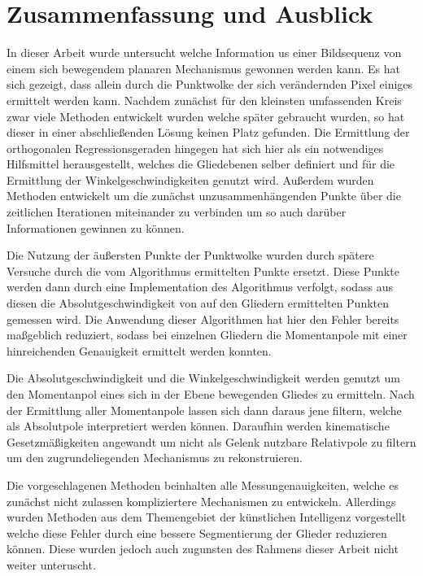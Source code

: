 
\chapter{Zusammenfassung und Ausblick} \label{ch:zusammenfassung_ausblick}


In dieser Arbeit wurde untersucht welche Information us einer Bildsequenz von einem sich bewegendem planaren Mechanismus gewonnen werden kann.
Es hat sich gezeigt, dass allein durch die Punktwolke der sich verändernden Pixel einiges ermittelt werden kann.
Nachdem zunächst für den kleinsten umfassenden Kreis zwar viele Methoden entwickelt wurden welche später gebraucht wurden, so hat dieser in einer abschlie{\ss}enden Lösung keinen Platz gefunden.
Die Ermittlung der orthogonalen Regressionsgeraden hingegen hat sich hier als ein notwendiges Hilfsmittel herausgestellt, welches die Gliedebenen selber definiert und für die Ermittlung der Winkelgeschwindigkeiten genutzt wird.
Au{\ss}erdem wurden Methoden entwickelt um die zunächst unzusammenhängenden Punkte über die zeitlichen Iterationen miteinander zu verbinden um so auch darüber Informationen gewinnen zu können.

Die Nutzung der äu{\ss}ersten Punkte der Punktwolke wurden durch spätere Versuche durch die vom  Algorithmus ermittelten Punkte ersetzt.
Diese Punkte werden dann durch eine Implementation des  Algorithmus verfolgt, sodass aus diesen die Absolutgeschwindigkeit von auf den Gliedern ermittelten Punkten gemessen wird.
Die Anwendung dieser Algorithmen hat hier den Fehler bereits ma{\ss}geblich reduziert, sodass bei einzelnen Gliedern die Momentanpole mit einer hinreichenden Genauigkeit ermittelt werden konnten.

Die Absolutgeschwindigkeit und die Winkelgeschwindigkeit werden genutzt um den Momentanpol eines sich in der Ebene bewegenden Gliedes zu ermitteln.
Nach der Ermittlung aller Momentanpole lassen sich dann daraus jene filtern, welche als Absolutpole interpretiert werden können.
Daraufhin werden kinematische Gesetzmä{\ss}igkeiten angewandt um nicht als Gelenk nutzbare Relativpole zu filtern um den zugrundeliegenden Mechanismus zu rekonstruieren.

Die vorgeschlagenen Methoden beinhalten alle Messungenauigkeiten, welche es zunächst nicht zulassen kompliziertere Mechanismen zu entwickeln.
Allerdings wurden Methoden aus dem Themengebiet der künstlichen Intelligenz vorgestellt welche diese Fehler durch eine bessere Segmentierung der Glieder reduzieren können.
Diese wurden jedoch auch zugunsten des Rahmens dieser Arbeit nicht weiter unteruscht.


